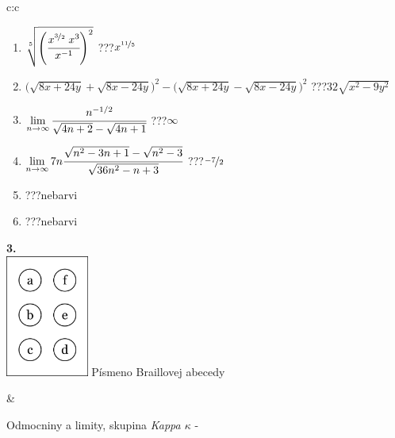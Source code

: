 \documentclass[10pt]{report}
\begin{document}
\begin{tabular}{c:c}
\begin{minipage}[c][104.5mm][t]{0.5\linewidth}
\begin{center}
\begin{minipage}{0.79\linewidth}
\begin{center}
\begin{varwidth}{\linewidth}
\begin{enumerate}
\small
\item $\sqrt[5]{\left(\cfrac{x^{\nicefrac{3}{2}}\;x^{3}}{x^{-1}}\right)^{2}}$\quad \dotfill\; ???\;\dotfill \quad $x^{\nicefrac{11}{5}}$
\item {\footnotesize{\scriptsize$\big(\sqrt{8x+24y}+\sqrt{8x-24y}\big)^2-\big(\sqrt{8x+24y}-\sqrt{8x-24y}\big)^2$}\quad \dotfill\; ???\;\dotfill \quad $32\sqrt{x^2-9y^2}$}
\item $\lim\limits_{n\to\infty}\cfrac{n^{-1/2}}{\sqrt{4n+2}-\sqrt{4n+1}}$\quad \dotfill\; ???\;\dotfill \quad $\infty$
\item $\lim\limits_{n\to\infty}7n\cfrac{\sqrt{n^2-3n+1}-\sqrt{n^2-3}}{\sqrt{36n^2-n+3}}$\quad \dotfill\; ???\;\dotfill \quad $\nicefrac{-7}{2}$
\item \quad \dotfill\; ???\;\dotfill \quad nebarvi
\item \quad \dotfill\; ???\;\dotfill \quad nebarvi
\end{enumerate}
\end{varwidth}
\end{center}
\end{minipage}
\begin{minipage}{0.20\linewidth}
\begin{center}
{\Huge\bfseries 3.} \\[2mm]
\includegraphics[height=40mm]{../images/braille.png}
{\small Písmeno Braillovej abecedy}
\end{center}
\end{minipage}
\end{center}
\end{minipage}
&
\begin{minipage}[c][104.5mm][t]{0.5\linewidth}
\begin{center}
\vspace{7mm}
{\huge Odmocniny a limity, skupina \textit{Kappa $\kappa$} -}\\[5mm]

\end{center}
\end{minipage}
\end{tabular}
\end{document}
